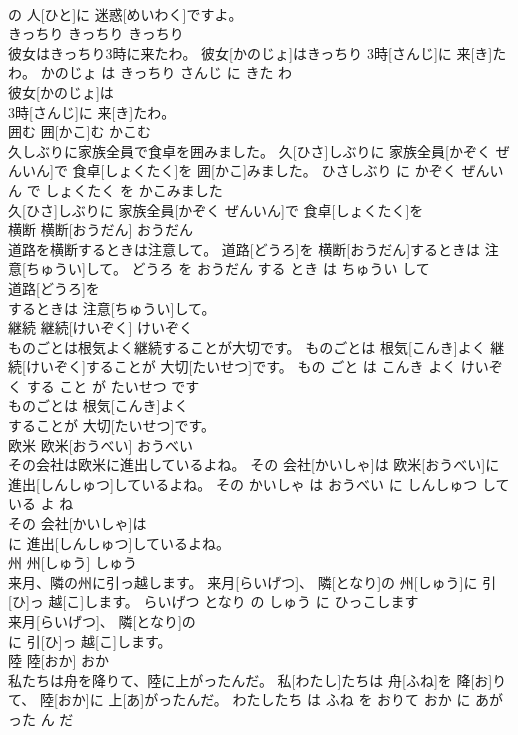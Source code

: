 \documentclass[8pt]{extreport}
\begin{document}
\begin{CJK}{UTF8}{min}
\\	の 人[ひと]に 迷惑[めいわく]ですよ。			
\\	きっちり	きっちり	きっちり	
\\	彼女はきっちり3時に来たわ。	彼女[かのじょ]はきっちり 3時[さんじ]に 来[き]たわ。	かのじょ は きっちり さんじ に きた わ	
\\	彼女[かのじょ]は
\\	3時[さんじ]に 来[き]たわ。			
\\	囲む	囲[かこ]む	かこむ	
\\	久しぶりに家族全員で食卓を囲みました。	久[ひさ]しぶりに 家族全員[かぞく ぜんいん]で 食卓[しょくたく]を 囲[かこ]みました。	ひさしぶり に かぞく ぜんいん で しょくたく を かこみました	
\\	久[ひさ]しぶりに 家族全員[かぞく ぜんいん]で 食卓[しょくたく]を
\\	横断	横断[おうだん]	おうだん	
\\	道路を横断するときは注意して。	道路[どうろ]を 横断[おうだん]するときは 注意[ちゅうい]して。	どうろ を おうだん する とき は ちゅうい して	
\\	道路[どうろ]を
\\	するときは 注意[ちゅうい]して。			
\\	継続	継続[けいぞく]	けいぞく	
\\	ものごとは根気よく継続することが大切です。	ものごとは 根気[こんき]よく 継続[けいぞく]することが 大切[たいせつ]です。	もの ごと は こんき よく けいぞく する こと が たいせつ です	
\\	ものごとは 根気[こんき]よく
\\	することが 大切[たいせつ]です。			
\\	欧米	欧米[おうべい]	おうべい	
\\	その会社は欧米に進出しているよね。	その 会社[かいしゃ]は 欧米[おうべい]に 進出[しんしゅつ]しているよね。	その かいしゃ は おうべい に しんしゅつ して いる よ ね	
\\	その 会社[かいしゃ]は
\\	に 進出[しんしゅつ]しているよね。			
\\	州	州[しゅう]	しゅう	
\\	来月、隣の州に引っ越します。	来月[らいげつ]、 隣[となり]の 州[しゅう]に 引[ひ]っ 越[こ]します。	らいげつ となり の しゅう に ひっこします	
\\	来月[らいげつ]、 隣[となり]の
\\	に 引[ひ]っ 越[こ]します。			
\\	陸	陸[おか]	おか	
\\	私たちは舟を降りて、陸に上がったんだ。	私[わたし]たちは 舟[ふね]を 降[お]りて、 陸[おか]に 上[あ]がったんだ。	わたしたち は ふね を おりて おか に あがった ん だ	

\end{CJK}
\end{document}
